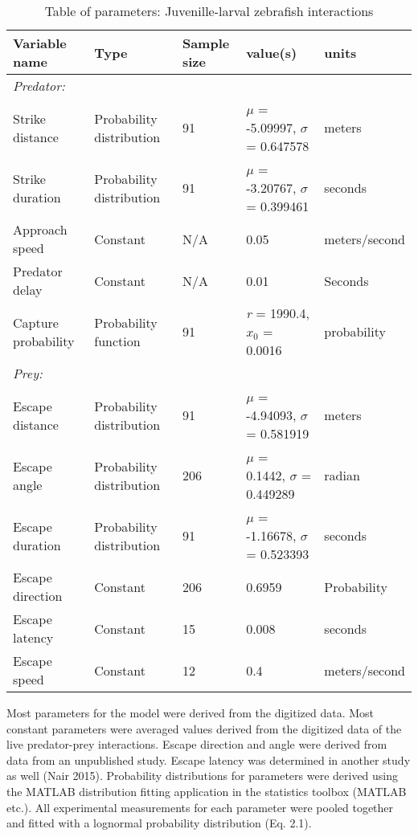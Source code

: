 \documentclass[]{rsos}%
\begin{document}
\begin{table}[!h]
\scriptsize
\caption{Table of parameters: Juvenille-larval zebrafish interactions}%
\label{table_example}
\begin{tabular}{lllll}%
\hline
Variable name &Type &Sample size &value(s) &units \\
\hline
\textit{Predator:}& & & & \\
Strike distance &Probability distribution &91 &$\mu$ = -5.09997, $\sigma$ = 0.647578 &meters \\
Strike duration &Probability distribution &91 &$\mu$ = -3.20767, $\sigma$ = 0.399461 &seconds \\
Approach speed &Constant &N/A &0.05 &meters/second \\
Predator delay &Constant &N/A &0.01 &Seconds \\
Capture probability &Probability function &91 &\textit{r} = 1990.4, \textit{$x_0$} = 0.0016  &probability \\
\textit{Prey:}& & & & \\
Escape distance &Probability distribution &91 &$\mu$ = -4.94093, $\sigma$ = 0.581919 &meters \\
Escape angle &Probability distribution &206 &$\mu$ = 0.1442, $\sigma$ = 0.449289 &radian \\
Escape duration &Probability distribution &91 &$\mu$ = -1.16678, $\sigma$ = 0.523393 &seconds \\
Escape direction &Constant &206 &0.6959 &Probability \\
Escape latency &Constant &15 &0.008 &seconds \\
Escape speed &Constant &12 &0.4 &meters/second \\\hline

\end{tabular}
\end{table}%

Most parameters for the model were derived from the digitized data. Most constant parameters were averaged values derived from the digitized data of the live predator-prey interactions. Escape direction and angle were derived from data from an unpublished study. Escape latency was determined in another study as well (Nair 2015). Probability distributions for parameters were derived using the MATLAB distribution fitting application in the statistics toolbox (MATLAB etc.). All experimental measurements for each parameter were pooled together and fitted with a lognormal probability distribution (Eq. 2.1).
\end{document}
